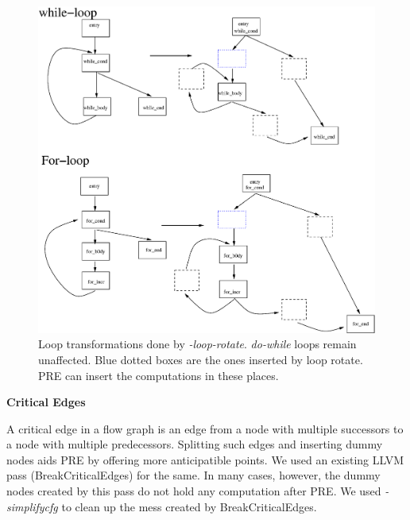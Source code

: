 \documentclass[10pt,twoside]{report}
\begin{document}
\begin{figure}[htbp]
  \begin{center}
     \includegraphics[scale=0.5]{Figs/5} 
  \end{center}
  \caption{Loop transformations done by \emph{-loop-rotate}. \emph{do-while}
    loops remain unaffected. Blue dotted boxes are the ones inserted by loop
      rotate. PRE can insert the computations in these places.}
  \label{fig:5} 
  \end{figure}

\begin{flushleft}
\textbf{\large{Critical Edges}}
\end{flushleft}

A critical edge in a flow graph is an edge from a node with multiple successors to a node with multiple predecessors. Splitting such edges and inserting dummy nodes aids PRE by offering more anticipatible points. We used an existing LLVM pass (BreakCriticalEdges) for the same. In many cases, however, the dummy nodes created by this pass do not hold any computation after PRE. We used \emph{-simplifycfg} to clean up the mess created by BreakCriticalEdges.
\end{document}
